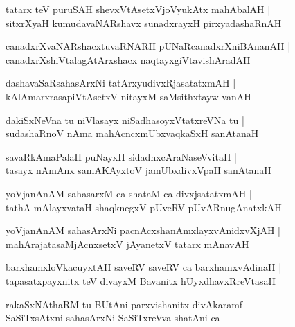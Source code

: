 \documentclass[twoside,12pt,openright]{book}
\newcounter{shloka}[chapter]
\begin{document}
\begin{shloka}
tatarx teV puruSAH shevxVtAsetxVjoVyukAtx mahAbalAH |\\
sitxrXyaH kumudavaNARshavx sunadxrayxH pirxyadashaRnAH
\end{shloka}

\begin{shloka}
canadxrXvaNARshacxtuvaRNARH pUNaRcanadxrXniBAnanAH |\\
canadxrXshiVtalagAtArxshacx naqtayxgiVtavishAradAH
\end{shloka}

\begin{shloka}
dashavaSaRsahasArxNi tatArxyudivxRjasatatxmAH |\\
kAlAmarxrasapiVtAsetxV nitayxM saMsithxtayw vanAH
\end{shloka}

\begin{shloka}
dakiSxNeVna tu niVlasayx niSadhasoyxVtatxreVNa tu |\\
sudashaRnoV nAma mahAcncxmUbxvaqkaSxH sanAtanaH
\end{shloka}

\begin{shloka}
savaRkAmaPalaH puNayxH sidadhxcAraNaseVvitaH |\\
tasayx nAmAnx samAKAyxtoV jamUbxdivxVpaH sanAtanaH
\end{shloka}

\begin{shloka}
yoVjanAnAM sahasarxM ca shataM ca divxjsatatxmAH |\\
tathA mAlayxvataH shaqknegxV pUveRV pUvARnugAnatxkAH
\end{shloka}

\begin{shloka}
yoVjanAnAM sahasArxNi pacnAcxshanAmxlayxvAnidxvXjAH |\\
mahArajatasaMjAcnxsetxV jAyanetxV tatarx mAnavAH
\end{shloka}

\begin{shloka}
barxhamxloVkacuyxtAH saveRV saveRV ca barxhamxvAdinaH |\\
tapasatxpayxnitx teV divayxM Bavanitx hUyxdhavxRreVtasaH
\end{shloka}

\begin{shloka}
rakaSxNAthaRM tu BUtAni parxvishanitx divAkaramf |\\
SaSiTxsAtxni sahasArxNi SaSiTxreVva shatAni ca 
\end{shloka}
\end{document}
